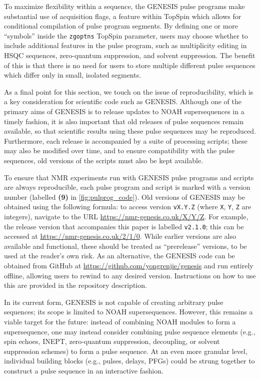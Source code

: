 \documentclass[a4paper,11pt]{article}
\begin{document}
\begin{refsection}
To maximize flexibility within a sequence, the GENESIS pulse programs make substantial use of acquisition flags, a feature within TopSpin which allows for conditional compilation of pulse program segments.
By defining one or more ``symbols'' inside the \texttt{zgoptns} TopSpin parameter, users may choose whether to include additional features in the pulse program, such as multiplicity editing in HSQC sequences, zero-quantum suppression\autocite{Thrippleton2003ACIE}, and solvent suppression.
The benefit of this is that there is no need for users to store multiple different pulse sequences which differ only in small, isolated segments.

As a final point for this section, we touch on the issue of reproducibility, which is a key consideration for scientific code such as GENESIS.\autocite{Perkel2020N}
Although one of the primary aims of GENESIS is to release updates to NOAH supersequences in a timely fashion, it is also important that old releases of pulse sequences remain available, so that scientific results using these pulse sequences may be reproduced. 
Furthermore, each release is accompanied by a suite of processing scripts; these may also be modified over time, and to ensure compatibility with the pulse sequences, old versions of the scripts must also be kept available.

To ensure that NMR experiments run with GENESIS pulse programs and scripts are always reproducible, each pulse program and script is marked with a version number (labelled \textbf{(9)} in \cref{fig:pulprog_code}).
Old versions of GENESIS may be obtained using the following formula: to access version \texttt{vX.Y.Z} (where \texttt{X}, \texttt{Y}, \texttt{Z} are integers), navigate to the URL \url{https://nmr-genesis.co.uk/X/Y/Z}.
For example, the release version that accompanies this paper is labelled \texttt{v2.1.0}; this can be accessed at \url{https://nmr-genesis.co.uk/2/1/0}.
While earlier versions are also available and functional, these should be treated as ``prerelease'' versions, to be used at the reader's own risk.
As an alternative, the GENESIS code can be obtained from GitHub at \url{https://github.com/yongrenjie/genesis} and run entirely offline, allowing users to rewind to any desired version.
Instructions on how to use this are provided in the repository description.

In its current form, GENESIS is not capable of creating arbitrary pulse sequences; its scope is limited to NOAH supersequences.
However, this remains a viable target for the future: instead of combining NOAH modules to form a supersequence, one may instead consider combining pulse sequence elements (e.g., spin echoes, INEPT, zero-quantum suppression, decoupling, or solvent suppression schemes) to form a pulse sequence.
At an even more granular level, individual building blocks (e.g., pulses, delays, PFGs) could be strung together to construct a pulse sequence in an interactive fashion.


\end{refsection}
\end{document}
